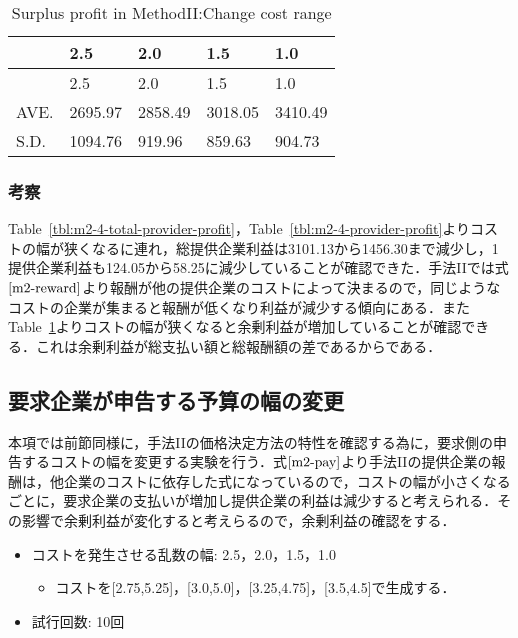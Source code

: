 \hypertarget{tbl:m2-4-surplus-profit}{}
\begin{longtable}[H]{@{}lllll@{}}
\caption{\label{tbl:m2-4-surplus-profit}Surplus profit in
MethodII:Change cost range}\tabularnewline
\toprule
& 2.5 & 2.0 & 1.5 & 1.0\tabularnewline
\midrule
\endfirsthead
\toprule
& 2.5 & 2.0 & 1.5 & 1.0\tabularnewline
\midrule
\endhead
AVE. & 2695.97 & 2858.49 & 3018.05 & 3410.49\tabularnewline
S.D. & 1094.76 & 919.96 & 859.63 & 904.73\tabularnewline
\bottomrule
\end{longtable}

\hypertarget{ux8003ux5bdf-7}{%
\subsubsection{考察}\label{ux8003ux5bdf-7}}

Table~\ref{tbl:m2-4-total-provider-profit}，Table~\ref{tbl:m2-4-provider-profit}よりコストの幅が狭くなるに連れ，総提供企業利益は3101.13から1456.30まで減少し，1提供企業利益も124.05から58.25に減少していることが確認できた．手法IIでは式\(\eqref{m2-reward}\)より報酬が他の提供企業のコストによって決まるので，同じようなコストの企業が集まると報酬が低くなり利益が減少する傾向にある．またTable~\ref{tbl:m2-4-surplus-profit}よりコストの幅が狭くなると余剰利益が増加していることが確認できる．これは余剰利益が総支払い額と総報酬額の差であるからである．

\hypertarget{ux8981ux6c42ux4f01ux696dux304cux7533ux544aux3059ux308bux4e88ux7b97ux306eux5e45ux306eux5909ux66f4-1}{%
\subsection{要求企業が申告する予算の幅の変更}\label{ux8981ux6c42ux4f01ux696dux304cux7533ux544aux3059ux308bux4e88ux7b97ux306eux5e45ux306eux5909ux66f4-1}}

本項では前節同様に，手法IIの価格決定方法の特性を確認する為に，要求側の申告するコストの幅を変更する実験を行う．式\(\eqref{m2-pay}\)より手法IIの提供企業の報酬は，他企業のコストに依存した式になっているので，コストの幅が小さくなるごとに，要求企業の支払いが増加し提供企業の利益は減少すると考えられる．その影響で余剰利益が変化すると考えらるので，余剰利益の確認をする．

\begin{itemize}
\tightlist
\item
  コストを発生させる乱数の幅: 2.5，2.0，1.5，1.0

  \begin{itemize}
  \tightlist
  \item
    コストを{[}2.75,5.25{]}，{[}3.0,5.0{]}，{[}3.25,4.75{]}，{[}3.5,4.5{]}で生成する．
  \end{itemize}
\item
  試行回数: 10回
\end{itemize}

